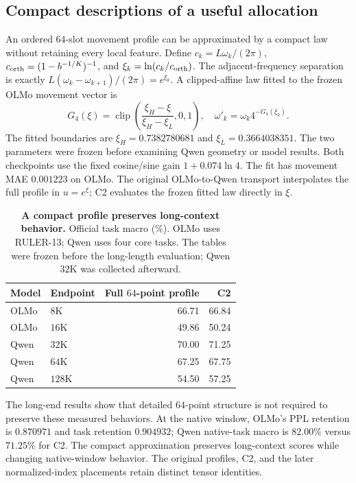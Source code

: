 \subsection{Compact descriptions of a useful allocation}
\label{sec:compact-coupling}

An ordered $64$-slot movement profile can be approximated by a compact law without retaining every local feature. Define $c_k=L\omega_k/(2\pi)$, $c_{\rm orth}=(1-b^{-1/K})^{-1}$, and $\xi_k=\ln(c_k/c_{\rm orth})$. The adjacent-frequency separation is exactly $L(\omega_k-\omega_{k+1})/(2\pi)=e^{\xi_k}$. A clipped-affine law fitted to the frozen OLMo movement vector is
\[
G_4(\xi)=\operatorname{clip}\!\left(\frac{\xi_H-\xi}{\xi_H-\xi_L},0,1\right),\quad
\omega'_k=\omega_k4^{-G_4(\xi_k)}.
\]
The fitted boundaries are $\xi_H=0.7382780681$ and $\xi_L=0.3664038351$. The two parameters were frozen before examining Qwen geometry or model results. Both checkpoints use the fixed cosine/sine gain $1+0.074\ln4$. The fit has movement MAE $0.001223$ on OLMo. The original OLMo-to-Qwen transport interpolates the full profile in $u=e^{\xi}$; C2 evaluates the frozen fitted law directly in $\xi$.

\begin{table}[ht]
\centering\small
\caption{\textbf{A compact profile preserves long-context behavior.} Official task macro (\%). OLMo uses RULER-13; Qwen uses four core tasks. The tables were frozen before the long-length evaluation; Qwen $32$K was collected afterward.}
\label{tab:c2-transport}
\begin{tabular}{@{}llrr@{}}
\toprule
Model & Endpoint & Full $64$-point profile & C2 \\
\midrule
OLMo & $8$K & 66.71 & 66.84 \\
OLMo & $16$K & 49.86 & 50.24 \\
Qwen & $32$K & 70.00 & 71.25 \\
Qwen & $64$K & 67.25 & 67.75 \\
Qwen & $128$K & 54.50 & 57.25 \\
\bottomrule
\end{tabular}
\end{table}

The long-end results show that detailed $64$-point structure is not required to preserve these measured behaviors. At the native window, OLMo's PPL retention is $0.870971$ and task retention $0.904932$; Qwen native-task macro is $82.00\%$ versus $71.25\%$ for C2. The compact approximation preserves long-context scores while changing native-window behavior. The original profiles, C2, and the later normalized-index placements retain distinct tensor identities.

